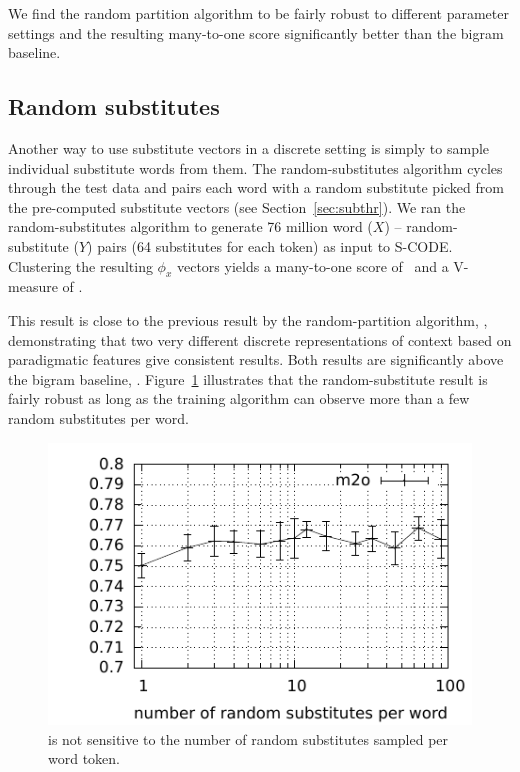 We find the random partition algorithm to be fairly robust to different
parameter settings and the resulting many-to-one score significantly
better than the bigram baseline.

\subsection{Random substitutes}\label{sec:wordsub}

Another way to use substitute vectors in a discrete setting is simply
to sample individual substitute words from them.  The
random-substitutes algorithm cycles through the test data and pairs
each word with a random substitute picked from the pre-computed
substitute vectors (see Section~\ref{sec:subthr}).  We ran the
random-substitutes algorithm to generate 76 million word ($X$) --
random-substitute ($Y$) pairs (64 substitutes for each token) as input
to S-CODE.  Clustering the resulting $\phi_x$ vectors yields a
many-to-one score of \wsmto\ and a V-measure of \wsvm.

This result is close to the previous result by the random-partition
algorithm, \rpmto, demonstrating that two very different discrete
representations of context based on paradigmatic features give
consistent results.  Both results are significantly above the bigram
baseline, \bgmto.  Figure~\ref{plot-s} illustrates that the
random-substitute result is fairly robust as long as the training
algorithm can observe more than a few random substitutes per word.

\begin{figure}[ht] \centering
\includegraphics[width=\linewidth]{plot-s.pdf}
\caption{\mto is not sensitive to the number of random substitutes
  sampled per word token.}
\label{plot-s}
\end{figure}
